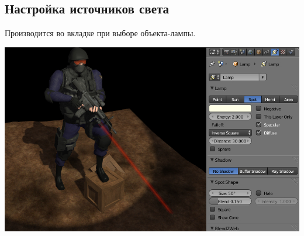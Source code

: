 \documentclass[a4paper,12pt,oneside]{sphinxmanual}
\begin{document}
\subsection{Настройка источников света}
\label{lighting:id4}
Производится во вкладке  при выборе объекта-лампы.

{\hfill\includegraphics[width=1.000\linewidth]{lighting_setup.jpg}\hfill}
\end{document}
